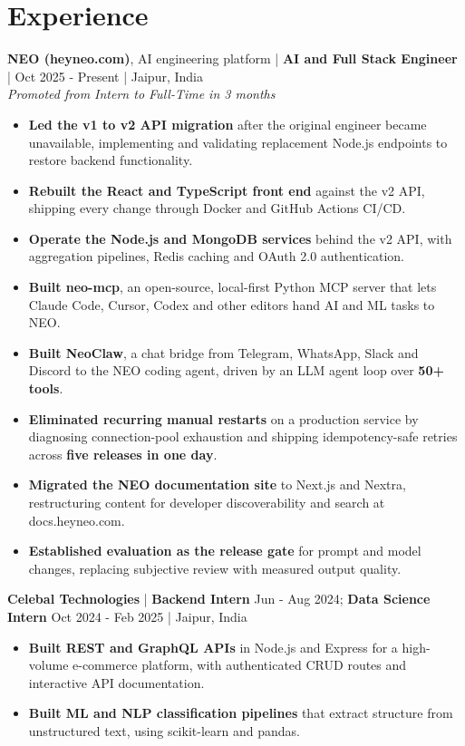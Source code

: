 \documentclass[10pt,letterpaper]{article}
\newcommand{\rolegap}{\vspace{3.5pt}}
\begin{document}
\section*{Experience}

\textbf{NEO (heyneo.com)}, AI engineering platform | \textbf{AI and Full Stack Engineer} |
Oct 2025 - Present | Jaipur, India\\
\textit{Promoted from Intern to Full-Time in 3 months}
\begin{itemize}
  \item \textbf{Led the v1 to v2 API migration} after the original engineer became unavailable, implementing and validating replacement Node.js endpoints to restore backend functionality.
  \item \textbf{Rebuilt the React and TypeScript front end} against the v2 API, shipping every change through Docker and GitHub Actions CI/CD.
  \item \textbf{Operate the Node.js and MongoDB services} behind the v2 API, with aggregation pipelines, Redis caching and OAuth 2.0 authentication.
  \item \textbf{Built neo-mcp}, an open-source, local-first Python MCP server that lets Claude Code, Cursor, Codex and other editors hand AI and ML tasks to NEO.
  \item \textbf{Built NeoClaw}, a chat bridge from Telegram, WhatsApp, Slack and Discord to the NEO coding agent, driven by an LLM agent loop over \textbf{50+ tools}.
  \item \textbf{Eliminated recurring manual restarts} on a production service by diagnosing connection-pool exhaustion and shipping idempotency-safe retries across \textbf{five releases in one day}.
  \item \textbf{Migrated the NEO documentation site} to Next.js and Nextra, restructuring content for developer discoverability and search at docs.heyneo.com.
  \item \textbf{Established evaluation as the release gate} for prompt and model changes, replacing subjective review with measured output quality.
\end{itemize}

\rolegap
\textbf{Celebal Technologies} | \textbf{Backend Intern} Jun - Aug 2024; \textbf{Data Science Intern}
Oct 2024 - Feb 2025 | Jaipur, India
\begin{itemize}
  \item \textbf{Built REST and GraphQL APIs} in Node.js and Express for a \mbox{high-volume} e-commerce platform, with authenticated CRUD routes and interactive API documentation.
  \item \textbf{Built ML and NLP classification pipelines} that extract structure from unstructured text, using scikit-learn and pandas.
\end{itemize}
\end{document}
